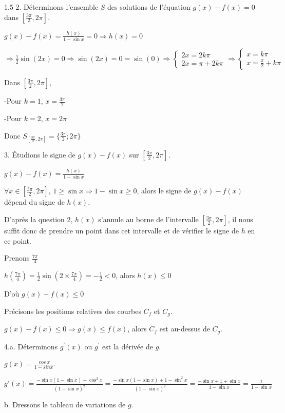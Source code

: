 \documentclass[12pt]{article}
\begin{document}
\begin{spacing}{1.5}
2. Déterminons l'ensemble $S$ des solutions de l'équation $g(x)-f(x)=0$ dans $[\frac{3\pi}{2},2\pi]$.

$g(x) - f(x)=\frac{h(x)}{1-\sin x}=0\Rightarrow h(x)=0$

$\Rightarrow \frac{1}{2}\sin(2x)=0\Rightarrow \sin(2x)=0=\sin(0)\Rightarrow \begin{cases}
2x=2k\pi\\
2x=\pi+2k\pi
\end{cases}\Rightarrow \begin{cases}
x=k\pi\\
x=\frac{\pi}{2}+k\pi
\end{cases}$

Dans $[\frac{3\pi}{2},2\pi]$,

-Pour $k=1$, $x=\frac{3\pi}{2}$

-Pour $k=2$, $x=2\pi$

Donc $S_{[\frac{3\pi}{2},2\pi]}=\{\frac{3\pi}{2};2\pi\}$


3. Étudions le signe de $g(x)-f(x)$ sur $[\frac{3\pi}{2},2\pi]$.

$g(x) - f(x)=\frac{h(x)}{1-\sin x}$

$\forall x\in [\frac{3\pi}{2},2\pi]$, $1\geq\sin x \Rightarrow 1-\sin x\geq 0$, alors le signe de $g(x)-f(x)$ dépend du signe de $h(x)$.

D'après la question 2, $h(x)$ s'annule au borne de l'intervalle $[\frac{3\pi}{2},2\pi]$, il nous suffit donc de prendre un point dans cet intervalle et de vérifier le signe de $h$ en ce point.

Prenons $\frac{7\pi}{4}$

$h(\frac{7\pi}{4})=\frac{1}{2}\sin(2\times \frac{7\pi}{4})=-\frac{1}{2}<0$, alors $h(x)\leq 0$

D'où $g(x) - f(x)\leq 0$

 Précisons les positions relatives des courbes $C_f$ et $C_g$.
 
 
 $g(x) - f(x)\leq 0\Rightarrow g(x)\leq f(x)$, alors $C_f$ est au-dessus de  $C_g$.

 

4.a. Déterminons $g^{\prime}(x)$ ou $g^{\prime}$ est la dérivée de $g$.

$g(x)=\frac{\cos x}{1 - sin x}$.

$g'(x)=\frac{-\sin x(1-\sin x)+\cos^2x}{(1-\sin x)^2}=\frac{-\sin x(1-\sin x)+1-\sin^2x}{(1-\sin x)^2}=\frac{-\sin x+1+\sin x}{1-\sin x}=\frac{1}{1-\sin x}$

b. Dressons le tableau de variations de $g$.


\end{spacing}
\end{document}
